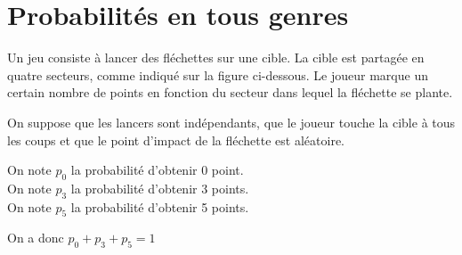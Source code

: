 \documentclass[oneside,12pt]{article}
\begin{document}



\newpage 

\section{Probabilités en tous genres}
\begin{minipage}{0.6\linewidth} \restoreskip
	Un jeu consiste à lancer des fléchettes sur une cible. La cible est partagée en quatre secteurs, comme 	indiqué sur la figure ci-dessous. Le joueur marque un certain nombre de points en fonction du secteur dans 	lequel la fléchette se plante.

	On suppose que les lancers sont indépendants, que le joueur touche la cible à tous les coups et que le point d'impact de la fléchette est aléatoire.
	
	On note $p_0$ la probabilité d’obtenir 0 point.\\
	On note $p_3$ la probabilité d’obtenir 3 points.\\
	On note $p_5$ la probabilité d’obtenir 5 points.
	
	On a donc $p_0 + p_3 + p_5 = 1$
\end{minipage} \hspace{5mm}
\begin{minipage}{0.6\linewidth}
\end{minipage}
\end{document}
